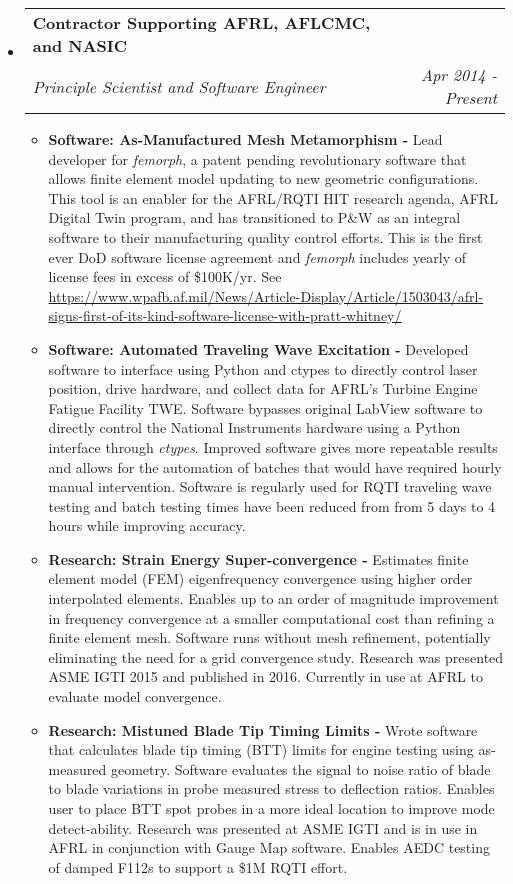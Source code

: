 \documentclass[letterpaper,11pt]{article}
\makeatletter
\newcommand{\resitem}[1]{\item #1 \vspace{-2pt}}
\newcommand{\ressubheading}[4]{
\begin{tabular*}{7.0in}{l@{\extracolsep{\fill}}r}
		\textbf{#1} & #2 \\
		\textit{#3} & \textit{#4} \\
\end{tabular*}\vspace{-6pt}}
\makeatother
\begin{document}
\begin{itemize}
\item
  \ressubheading{Contractor Supporting AFRL, AFLCMC, and NASIC}{}{Principle Scientist and Software Engineer}{Apr 2014 - Present}
  \begin{itemize}
    \resitem{\textbf{Software: As-Manufactured Mesh Metamorphism - } Lead developer for \textit{femorph}, a patent pending revolutionary software that allows finite element model updating to new geometric configurations.  This tool is an enabler for the AFRL/RQTI HIT research agenda, AFRL Digital Twin program, and has transitioned to P\&W as an integral software to their manufacturing quality control efforts.  This is the first ever DoD software license agreement and \textit{femorph} includes yearly of license fees in excess of \$100K/yr.  See \url{https://www.wpafb.af.mil/News/Article-Display/Article/1503043/afrl-signs-first-of-its-kind-software-license-with-pratt-whitney/}}
    \resitem{\textbf{Software: Automated Traveling Wave Excitation -} Developed software to interface using Python and ctypes to directly control laser position, drive hardware, and collect data for AFRL's Turbine Engine Fatigue Facility TWE.  Software bypasses original LabView software to directly control the National Instruments hardware using a Python interface through \textit{ctypes}.  Improved software gives more repeatable results and allows for the automation of batches that would have required hourly manual intervention. Software is regularly used for RQTI traveling wave testing and batch testing times have been reduced from from 5 days to 4 hours while improving accuracy.}
    \resitem{\textbf{Research: Strain Energy Super-convergence - }  Estimates finite element model (FEM) eigenfrequency convergence using higher order interpolated elements.  Enables up to an order of magnitude improvement in frequency convergence at a smaller computational cost than refining a finite element mesh.  Software runs without mesh refinement, potentially eliminating the need for a grid convergence study.  Research was presented ASME IGTI 2015 and published in 2016.  Currently in use at AFRL to evaluate model convergence.}
    \resitem{\textbf{Research: Mistuned Blade Tip Timing Limits - }  Wrote software that calculates blade tip timing (BTT) limits for engine testing using as-measured geometry.  Software evaluates the signal to noise ratio of blade to blade variations in probe measured stress to deflection ratios.  Enables user to place BTT spot probes in a more ideal location to improve mode detect-ability.  Research was presented at ASME IGTI and is in use in AFRL in conjunction with Gauge Map software.  Enables AEDC testing of damped F112s to support a \$1M RQTI effort.}

\end{itemize}
\end{itemize}
\end{document}
